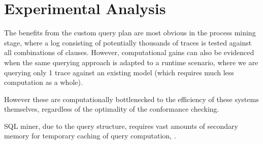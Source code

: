\section{Experimental Analysis}
The benefits from the custom query plan are most obvious in the process mining stage, where a log consisting of potentially thousands of traces is tested against all combinations of clauses. However, computational gains can also be evidenced when the same querying approach is adapted to a runtime scenario, where we are querying only 1 trace against an existing model (which requires much less computation as a whole).

However these are computationally bottlenecked to the efficiency of these systems themselves, regardless of the optimality of the conformance checking.

SQL miner, due to the query structure, requires vast amounts of secondary memory for temporary caching of query computation, .